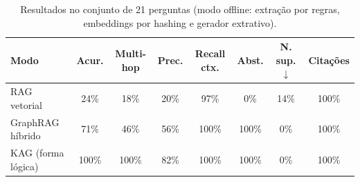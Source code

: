 \begin{table}[ht]
\centering
\caption{Resultados no conjunto de 21 perguntas (modo offline: extração por regras, embeddings por hashing e gerador extrativo).}
\label{tab:resultados}
\begin{tabular}{lccccccc}
\hline
Modo & Acur. & Multi-hop & Prec. & Recall ctx. & Abst. & N. sup.$\downarrow$ & Citações \\
\hline
RAG vetorial & 24\% & 18\% & 20\% & 97\% & 0\% & 14\% & 100\% \\
GraphRAG híbrido & 71\% & 46\% & 56\% & 100\% & 100\% & 0\% & 100\% \\
KAG (forma lógica) & 100\% & 100\% & 82\% & 100\% & 100\% & 0\% & 100\% \\
\hline
\end{tabular}
\end{table}
